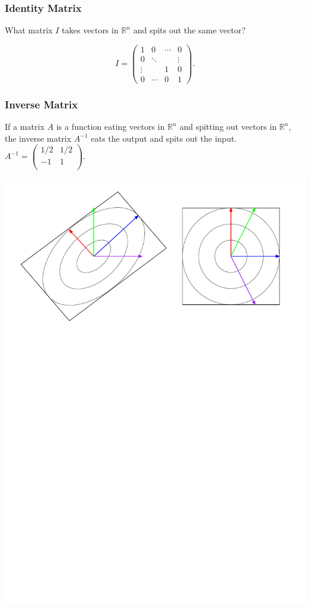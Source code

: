 \documentclass[12pt]{beamer}
\newcommand{\RR}{\ensuremath{\mathbb{R}}}
\theoremstyle{definition}
\begin{document}
\begin{frame}
\frametitle{Identity Matrix}
What matrix $I$ takes vectors in $\RR^n$ and
spits out the same vector?


\[ I  = \left( \begin{array}{ccccc}  
1 & 0 & \cdots & 0 \\
0 & \ddots &  & \vdots \\
\vdots &  & 1 & 0 \\ 
0 & \cdots & 0 & 1
\end{array} \right).\]

\end{frame}


\begin{frame}
\frametitle{Inverse Matrix}
If a matrix $A$ is a function eating vectors in $\RR^n$ and
spitting out vectors in $\RR^n$, the inverse matrix $A^{-1}$ eats
the output and spits out the input.
$A^{-1}  = \left( \begin{array}{cc}  1/2 & 1/2  \\-1 & 1 \\ \end{array} \right)$.

\centerline{\includegraphics[width=.8\textwidth]{matr-pic2.pdf}}

\end{frame}
\end{document}
